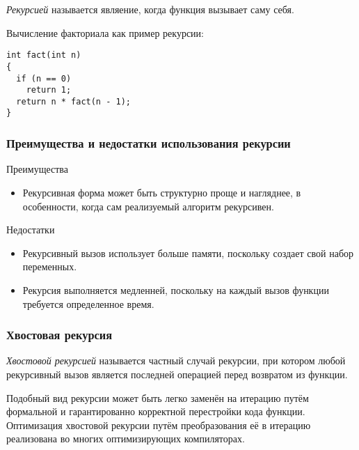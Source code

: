 \begin{definition}
  \textit{Рекурсией} называется являение, когда функция вызывает саму себя.
\end{definition}

Вычисление факториала как пример рекурсии:

\begin{verbatim}
int fact(int n)
{
  if (n == 0)
    return 1;
  return n * fact(n - 1);
}
\end{verbatim}

\subsubsection{Преимущества и недостатки использования рекурсии}

Преимущества
\begin{itemize}
  \item Рекурсивная форма может быть структурно проще и нагляднее, в особенности, когда сам реализуемый алгоритм рекурсивен.
\end{itemize}

Недостатки
\begin{itemize}
  \item Рекурсивный вызов использует больше памяти, поскольку создает свой набор переменных.
  \item Рекурсия выполняется медленней, поскольку на каждый вызов функции требуется определенное время.
\end{itemize}

\subsubsection{Хвостовая рекурсия}

\begin{definition}
  \textit{Хвостовой рекурсией} называется частный случай рекурсии, при котором любой рекурсивный вызов является последней операцией перед возвратом из функции.
\end{definition}

Подобный вид рекурсии может быть легко заменён на итерацию путём формальной и гарантированно корректной перестройки кода функции. Оптимизация хвостовой рекурсии путём преобразования её в итерацию реализована во многих оптимизирующих компиляторах.

